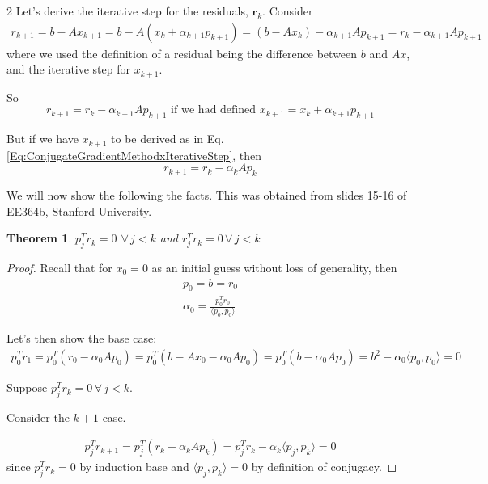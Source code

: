 \documentclass[10pt]{amsart}
\newtheorem{theorem}{Theorem}
\begin{document}
\begin{multicols*}{2}
Let's derive the iterative step for the residuals, $\mathbf{r}_k$. Consider
\[
\begin{gathered}
	r_{k+1} = b-Ax_{k+1} = b- A(x_k + \alpha_{k+1} p_{k+1}) = (b-Ax_k) - \alpha_{k+1} A p_{k+1} = r_k - \alpha_{k+1} A p_{k+1}
\end{gathered}
\]
where we used the definition of a residual being the difference between $b$ and $Ax$, and the iterative step for $x_{k+1}$.

So
\begin{equation}
	r_{k+1} = r_k - \alpha_{k+1} A p_{k+1} \text{ if we had defined } x_{k+1} = x_k + \alpha_{k+1} p_{k+1}
\end{equation}

But if we have $x_{k+1}$ to be derived as in Eq. \ref{Eq:ConjugateGradientMethodxIterativeStep}, then
\begin{equation}
	r_{k+1} = r_k - \alpha_k A p_k
\end{equation}

We will now show the following the facts. This was obtained from slides 15-16 of \href{https://web.stanford.edu/class/ee364b/lectures/conj_grad_slides.pdf}{EE364b, Stanford University}.

\begin{theorem}
	$p_j^T r_k =0$ $\forall\, j < k$ and $r_j^T r_k =0 \, \forall \, j < k$
\end{theorem}

\begin{proof}
Recall that for $x_0 = 0$ as an initial guess without loss of generality, then
\[
\begin{gathered}
	p_0 = b = r_0 \\
	\alpha_0 = \frac{p_0^T r_0 }{ \langle p_0, p_0 \rangle }
\end{gathered}
\]

Let's then show the base case:
\[
\begin{gathered}
p_0^T r_1 = p_0^T (r_0 - \alpha_0 A p_0) = p_0^T (b-Ax_0 - \alpha_0 A p_0 ) = p_0^T (b- \alpha_0 A p_0 ) = b^2 -\alpha_0 \langle p_0, p_0 \rangle = 0 	
\end{gathered}
\]

Suppose $p_j^T r_k = 0 \, \forall \, j < k$.

Consider the $k+1$ case.

\[
\begin{gathered}
	p_j^T r_{k+1} = p_j^T (r_k - \alpha_k Ap_k) = p_j^T r_k - \alpha_k \langle p_j, p_k \rangle = 0
\end{gathered}
\]
since $p_j^T r_k = 0$ by induction base and $\langle p_j , p_k \rangle =0$ by definition of conjugacy.


\end{proof}
\end{multicols*}
\end{document}
